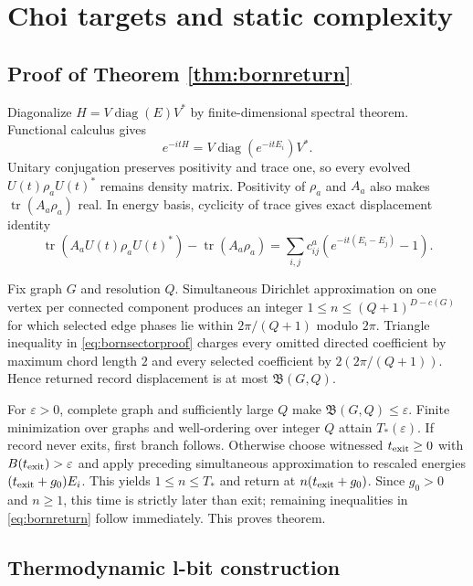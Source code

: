 \section{Choi targets and static complexity}

\subsection{Proof of Theorem \ref{thm:bornreturn}}

Diagonalize $H=V\operatorname{diag}(E)V^*$ by finite-dimensional spectral
theorem.  Functional calculus gives
\[
 e^{-itH}=V\operatorname{diag}(e^{-itE_i})V^*.
\]
Unitary conjugation preserves positivity and trace one, so every evolved
$U(t)\rho_aU(t)^*$ remains density matrix.  Positivity of $\rho_a$ and
$A_a$ also makes $\operatorname{tr}(A_a\rho_a)$ real.  In energy basis,
cyclicity of trace gives exact displacement identity
\begin{equation}
 \operatorname{tr}(A_aU(t)\rho_aU(t)^*)-
 \operatorname{tr}(A_a\rho_a)
 =\sum_{i,j}c^a_{ij}
   \left(e^{-it(E_i-E_j)}-1\right).                 \label{eq:bornsectorproof}
\end{equation}

Fix graph $G$ and resolution $Q$.  Simultaneous Dirichlet approximation on
one vertex per connected component produces an integer
$1\le n\le(Q+1)^{D-c(G)}$ for which selected edge phases lie within
$2\pi/(Q+1)$ modulo $2\pi$.  Triangle inequality in
\eqref{eq:bornsectorproof} charges every omitted directed coefficient by
maximum chord length $2$ and every selected coefficient by
$2(2\pi/(Q+1))$.  Hence returned record displacement is at most
$\mathfrak B(G,Q)$.

For $\varepsilon>0$, complete graph and sufficiently large $Q$ make
$\mathfrak B(G,Q)\le\varepsilon$.  Finite minimization over graphs and
well-ordering over integer $Q$ attain $T_*(\varepsilon)$.  If record never
exits, first branch follows.  Otherwise choose witnessed
$t_{\rm exit}\ge0$ with $B(t_{\rm exit})>\varepsilon$ and apply preceding
simultaneous approximation to rescaled energies
$(t_{\rm exit}+g_0)E_i$.  This yields $1\le n\le T_*$ and return at
$n(t_{\rm exit}+g_0)$.  Since $g_0>0$ and $n\ge1$, this time is strictly
later than exit; remaining inequalities in \eqref{eq:bornreturn} follow
immediately.  This proves theorem.

\subsection{Thermodynamic l-bit construction}


